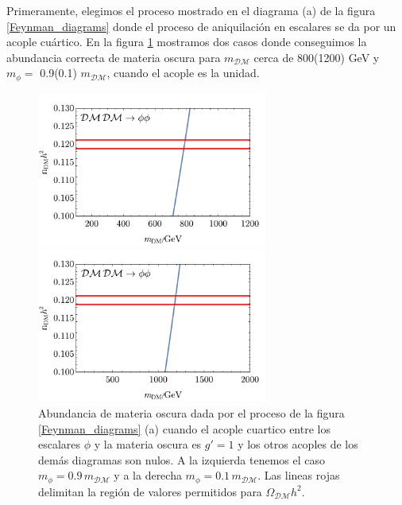 Primeramente, elegimos el proceso mostrado en el diagrama (a) de la figura \ref{Feynman_diagrams} donde el proceso de aniquilación en escalares se da por un acople cuártico. En la figura \ref{Results-scalars} mostramos dos casos donde  conseguimos la abundancia correcta de materia oscura para $m_\mathcal{DM}$ cerca de 800(1200) GeV y $m_\phi=$ 0.9(0.1) $m_\mathcal{DM}$, cuando el acople es la unidad.

\begin{figure}[h]
\centering
\begin{minipage}{.5\textwidth}
  \centering
  \includegraphics[height=2in]{Results/scalars-1.pdf}
\end{minipage}%
\centering
\begin{minipage}{.5\textwidth}
  \centering
  \includegraphics[height=2in]{Results/scalars-2.pdf}
\end{minipage}%
\caption[\hspace{0.1in}Abundancia de materia oscura 1]{Abundancia de materia oscura dada por el proceso de la figura \ref{Feynman_diagrams} (a) cuando el acople cuartico entre los escalares $\phi$ y la materia oscura es $g'=1$ y los otros acoples de los demás diagramas son nulos. A la izquierda tenemos el caso $m_\phi =0.9\, m_\mathcal{DM}$ y a la derecha $m_\phi =0.1\, m_\mathcal{DM}$. Las lineas rojas delimitan la región de valores permitidos para $\Omega_{\mathcal{DM}}h^2$.} 
\label{Results-scalars}
\end{figure}


